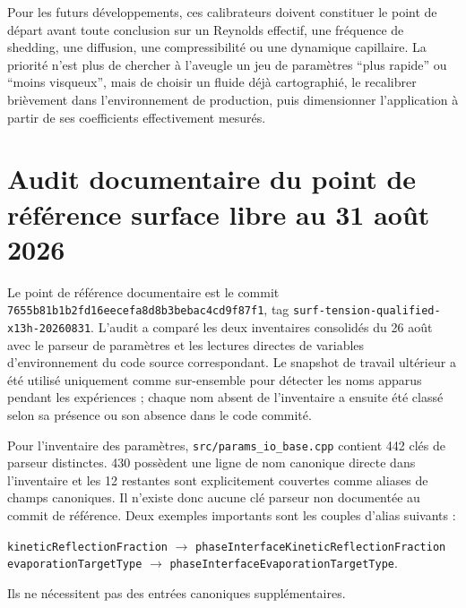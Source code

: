 \documentclass[11pt,a4paper]{article}
\begin{document}
Pour les futurs développements, ces calibrateurs doivent constituer le point de départ avant toute conclusion sur un Reynolds effectif, une fréquence de shedding, une diffusion, une compressibilité ou une dynamique capillaire. La priorité n'est plus de chercher à l'aveugle un jeu de paramètres ``plus rapide'' ou ``moins visqueux'', mais de choisir un fluide déjà cartographié, le recalibrer brièvement dans l'environnement de production, puis dimensionner l'application à partir de ses coefficients effectivement mesurés.



\section{Audit documentaire du point de référence surface libre au 31 août 2026}
\label{sec:inventory-audit-7655}

Le point de référence documentaire est le commit \nolinkurl{7655b81b1b2fd16eecefa8d8b3bebac4cd9f87f1}, tag \nolinkurl{surf-tension-qualified-x13h-20260831}. L'audit a comparé les deux inventaires consolidés du 26 août avec le parseur de paramètres et les lectures directes de variables d'environnement du code source correspondant. Le snapshot de travail ultérieur a été utilisé uniquement comme sur-ensemble pour détecter les noms apparus pendant les expériences ; chaque nom absent de l'inventaire a ensuite été classé selon sa présence ou son absence dans le code commité.

Pour l'inventaire des paramètres, \nolinkurl{src/params_io_base.cpp} contient 442 clés de parseur distinctes. 430 possèdent une ligne de nom canonique directe dans l'inventaire et les 12 restantes sont explicitement couvertes comme aliases de champs canoniques. Il n'existe donc aucune clé parseur non documentée au commit de référence. Deux exemples importants sont les couples d'alias suivants :
\begin{center}
\small
\nolinkurl{kineticReflectionFraction} $\rightarrow$ \nolinkurl{phaseInterfaceKineticReflectionFraction}\\
\nolinkurl{evaporationTargetType} $\rightarrow$ \nolinkurl{phaseInterfaceEvaporationTargetType}.
\end{center}
Ils ne nécessitent pas des entrées canoniques supplémentaires.
\end{document}
